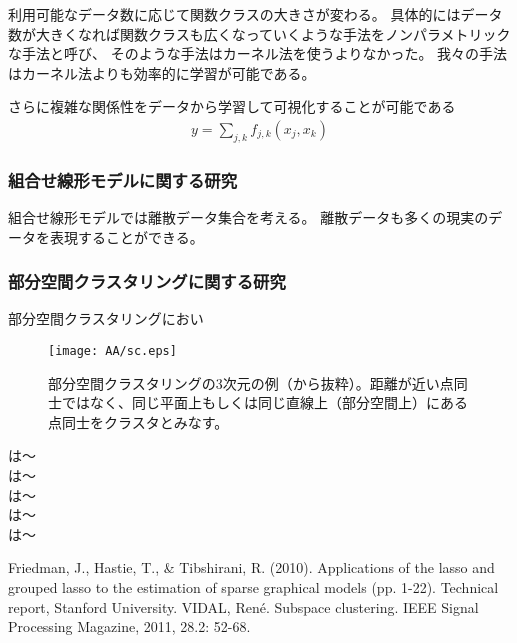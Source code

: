 利用可能なデータ数に応じて関数クラスの大きさが変わる。
具体的にはデータ数が大きくなれば関数クラスも広くなっていくような手法をノンパラメトリックな手法と呼び、
そのような手法はカーネル法を使うよりなかった。
我々の手法はカーネル法よりも効率的に学習が可能である。


さらに複雑な関係性をデータから学習して可視化することが可能である
\begin{align*}
    y = \sum_{j,k} f_{j,k} (x_j,x_k)
\end{align*}




\subsubsection{組合せ線形モデルに関する研究}

組合せ線形モデルでは離散データ集合を考える。
離散データも多くの現実のデータを表現することができる。



\subsubsection{部分空間クラスタリングに関する研究}

部分空間クラスタリングにおい

\begin{figure}[h]
    \centering
    \texttt{[image: AA/sc.eps]}
    \caption{部分空間クラスタリングの3次元の例（\cite{SC}から抜粋）。距離が近い点同士ではなく、同じ平面上もしくは同じ直線上（部分空間上）にある点同士をクラスタとみなす。}
    \label{fig:my_label}
\end{figure}
\cite{HSM01}は〜\\
\cite{HSM02}は〜\\
\cite{KM01}は〜\\
\cite{KM02}は〜\\
\cite{NM01}は〜

\begin{thebibliography}{9}
    Friedman, J., Hastie, T., & Tibshirani, R. (2010). 
    Applications of the lasso and grouped lasso to the estimation of sparse graphical models (pp. 1-22). Technical report, Stanford University.
 VIDAL, René. Subspace clustering. IEEE Signal Processing Magazine, 2011, 28.2: 52-68.
\end{thebibliography}

